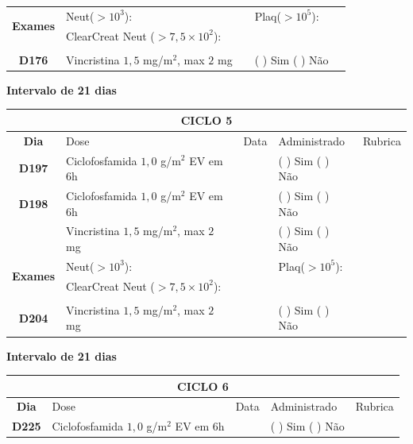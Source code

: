 \documentclass[11pt,a4paper,oldfontcommands]{memoir}
\begin{document}
\begin{center}
\begin{longtable}{p{1cm}p{5cm}|p{1cm}|p{4cm}|p{2.5cm}}
    \hline
    \multicolumn{1}{c|}{\multirow{2}{*}{\textbf{Exames}}}&\multicolumn{2}{l|}{Neut(\(>10^3\)):}&{Plaq(\(>10^5\)):}&\\
    \cline{2-5}
    \multicolumn{1}{c|}{\multirow{2}{*}{{}}}&\multicolumn{2}{l|}{ClearCreat Neut (\(>7,5\times10^2\)):}&{}&{}\\
    \hline\\
    \hline
    \multicolumn{1}{c|}{\multirow{1}{*}{\textbf{D176}}}&{Vincristina \(1,5\) mg/m\(^2\), max \(2\) mg}&&{(  ) Sim (  ) Não}&\\
    \hline
\end{longtable}
\textbf{Intervalo de 21 dias}
    \begin{longtable}{p{1cm}p{5cm}|p{1cm}|p{4cm}|p{2.5cm}}
    \hline
	\multicolumn{5}{c}{\textbf{CICLO 5}}\\
	\hline
    \multicolumn{1}{c|}{\multirow{1}{*}{\textbf{Dia}}}&{Dose}&{Data}&{Administrado}&{Rubrica} \\
    \hline
    \multicolumn{1}{c|}{\multirow{1}{*}{\textbf{D197}}}&{Ciclofosfamida \(1,0\) g/m\(^2\) EV em 6h}&&{(  ) Sim (  ) Não}&\\
    \multicolumn{1}{c|}{\multirow{1}{*}{\textbf{D198}}}&{Ciclofosfamida \(1,0\) g/m\(^2\) EV em 6h}&&{(  ) Sim (  ) Não}&\\
    \multicolumn{1}{c|}{\multirow{1}{*}{\textbf{}}}&{Vincristina \(1,5\) mg/m\(^2\), max \(2\) mg}&&{(  ) Sim (  ) Não}&\\
    \hline
    \multicolumn{1}{c|}{\multirow{2}{*}{\textbf{Exames}}}&\multicolumn{2}{l|}{Neut(\(>10^3\)):}&{Plaq(\(>10^5\)):}&\\
    \cline{2-5}
    \multicolumn{1}{c|}{\multirow{2}{*}{{}}}&\multicolumn{2}{l|}{ClearCreat Neut (\(>7,5\times10^2\)):}&{}&{}\\
    \hline
    \\
    \hline
    \multicolumn{1}{c|}{\multirow{1}{*}{\textbf{D204}}}&{Vincristina \(1,5\) mg/m\(^2\), max \(2\) mg}&&{(  ) Sim (  ) Não}&\\
    \hline
\end{longtable}
\textbf{Intervalo de 21 dias}
\    \begin{longtable}{p{1cm}p{5cm}|p{1cm}|p{4cm}|p{2.5cm}}
    \hline
	\multicolumn{5}{c}{\textbf{CICLO 6}}\\
	\hline
    \multicolumn{1}{c|}{\multirow{1}{*}{\textbf{Dia}}}&{Dose}&{Data}&{Administrado}&{Rubrica} \\
    \hline
    \multicolumn{1}{c|}{\multirow{1}{*}{\textbf{D225}}}&{Ciclofosfamida \(1,0\) g/m\(^2\) EV em 6h}&&{(  ) Sim (  ) Não}&\\

\end{longtable}
\end{center}
\end{document}
